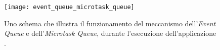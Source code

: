 \begin{figure}
	\begin{center}
		\texttt{[image: event\_queue\_microtask\_queue]}
		\caption[Screenshot - Schema di Event Queue e Microtask Queue]{Uno schema che illustra il funzionamento del meccanismo dell'\textit{Event Queue} e dell'\textit{Microtask Queue}, durante l'esecuzione dell'applicazione \cite{event_queue_microtask_queue}.}
		\label{figura:event_queue_microtask_queue}
	\end{center}
\end{figure}
